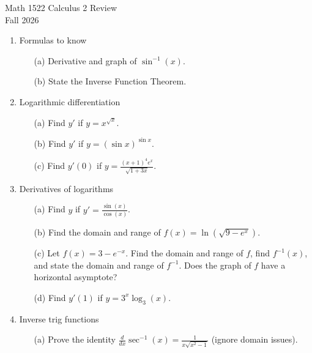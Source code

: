 \documentclass[12pt]{article}
\begin{document}
\raggedright
\begin{center}
      {\large Math 1522 Calculus 2 Review}\\
  {Fall 2026}\\
\end{center}

\begin{enumerate}
\setcounter{enumi}{0}
\item Formulas to know
\begin{enumerate}
\item[(a)] Derivative and graph of $\sin^{-1}(x)$.

\item[(b)] State the Inverse Function Theorem.

\end{enumerate}

\setcounter{enumi}{1}
\item Logarithmic differentiation
\begin{enumerate}
\item[(a)] Find $y'$ if $y=x^{\sqrt{x}}$.

\item[(b)] Find $y'$ if $y=(\sin x)^{\sin x}$.

\item[(c)] Find $y'(0)$ if $y=\frac{(x+1)^4e^x}{\sqrt{1+3x}}$.

\end{enumerate}

\setcounter{enumi}{2}
\item Derivatives of logarithms
\begin{enumerate}
\item[(a)] Find $y$ if $y'=\frac{\sin(x)}{\cos(x)}$.

\item[(b)] Find the domain and range of $f(x)=\ln(\sqrt{9-e^x})$.

\item[(c)] Let $f(x)=3-e^{-x}$. Find the domain and range of $f$, find $f^{-1}(x)$, and state the domain and range of $f^{-1}$. Does the graph of $f$ have a horizontal asymptote?

\item[(d)] Find $y'(1)$ if $y=3^x\log_3(x)$.

\end{enumerate}

\setcounter{enumi}{3}
\item Inverse trig functions
\begin{enumerate}
\item[(a)] Prove the identity $\frac{d}{dx}\sec^{-1}(x)=\frac{1}{x\sqrt{x^2-1}}$ (ignore domain issues).


\end{enumerate}
\end{enumerate}
\end{document}
